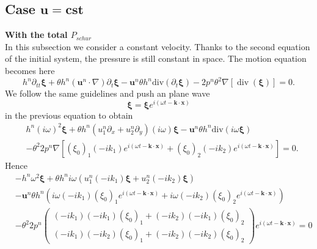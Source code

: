 \documentclass[a4paper, 11pt]{article}
\begin{document}
\subsection{Case $\boldsymbol{u}=\boldsymbol{cst}$}
\textbf{With the total $P_{schur}$}\\
In this subsection we consider a constant velocity. Thanks to the second equation of the initial system, the pressure is still constant in space.
The motion equation becomes here
\begin{equation*}
h^n\partial_{tt} \boldsymbol{\xi}+\theta h^n\left(\boldsymbol{u}^n\cdot\nabla\right) \partial_t\boldsymbol{\xi}- \boldsymbol{u}^n\theta h^n\text{div}\left(\partial_t \boldsymbol{\xi}\right)
-2p^n \theta^2 \nabla\left[\operatorname{div}( \boldsymbol{\xi}) \right]=0.
\end{equation*}
We follow the same guidelines and push an plane wave
\begin{equation*}
\boldsymbol{\xi}=\boldsymbol{\xi}e^{i(\omega t-\boldsymbol{k}\cdot \boldsymbol{x})}
\end{equation*}
in the previous equation to obtain
\begin{equation*}
\begin{split}
&h^n(i\omega)^2\boldsymbol{\xi}+\theta h^n (u_1^n\partial_x+u_2^n\partial_y)(i\omega)\boldsymbol{\xi}-\boldsymbol{u}^n\theta h^n\text{div}\left(i\omega\boldsymbol{\xi}\right)\\
&-\theta^2 2p^n\nabla \left[(\xi_0)_1(-ik_1)e^{i(\omega t-\boldsymbol{k}\cdot \boldsymbol{x})}+(\xi_0)_2(-ik_2)e^{i(\omega t-\boldsymbol{k}\cdot \boldsymbol{x})}\right]=0.
\end{split}
\end{equation*}
Hence
\begin{equation*}
\begin{split}
&-h^n\omega^2\boldsymbol{\xi}+\theta h^n i\omega\left(u_1^n(-ik_1)\boldsymbol{\xi}+u_2^n(-ik_2)\boldsymbol{\xi}\right)\\
&-\boldsymbol{u}^n\theta h^n\left(i\omega (-i k_1)(\xi_0)_1e^{i(\omega t-\boldsymbol{k}\cdot \boldsymbol{x})}+i\omega (-ik_2)(\xi_0)_2e^{i(\omega t-\boldsymbol{k}\cdot \boldsymbol{x})}\right)\\
&-\theta^2 2p^n\begin{pmatrix}(-ik_1)(-ik_1)(\xi_0)_1+(-ik_2)(-ik_1)(\xi_0)_2\\(-ik_1)(-ik_2)(\xi_0)_1+(-ik_2)(-ik_2)(\xi_0)_2\end{pmatrix}e^{i(\omega t-\boldsymbol{k}\cdot \boldsymbol{x})}=0
\end{split}
\end{equation*}
\end{document}

